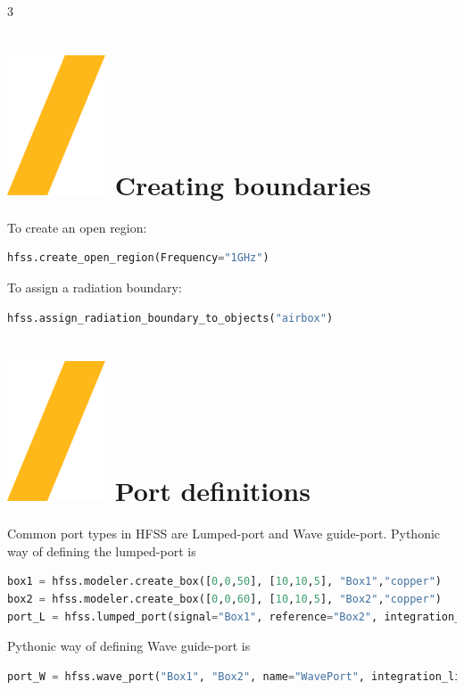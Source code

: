 \documentclass[9pt,landscape]{article}
\begin{document}
\begin{multicols}{3}
\section{\includegraphics[height=\fontcharht\font`\S]{slash.png} Creating boundaries}
To create an open region:
\begin{lstlisting}[language=Python]
hfss.create_open_region(Frequency="1GHz")
\end{lstlisting}
To assign a radiation boundary:
\begin{lstlisting}[language=Python]
hfss.assign_radiation_boundary_to_objects("airbox")
\end{lstlisting}

\section{\includegraphics[height=\fontcharht\font`\S]{slash.png} Port definitions}
Common port types in HFSS are Lumped-port and Wave guide-port. Pythonic way of defining the lumped-port is
\begin{lstlisting}[language=Python]
box1 = hfss.modeler.create_box([0,0,50], [10,10,5], "Box1","copper")
box2 = hfss.modeler.create_box([0,0,60], [10,10,5], "Box2","copper")
port_L = hfss.lumped_port(signal="Box1", reference="Box2", integration_line=hfss.AxisDir.XNeg, impedance=50, name="LumpedPort", renormalize=True, deembed=False)
\end{lstlisting}
Pythonic way of defining Wave guide-port is
\begin{lstlisting}[language=Python]
port_W = hfss.wave_port("Box1", "Box2", name="WavePort", integration_line=1)
\end{lstlisting}


\end{multicols}
\end{document}

